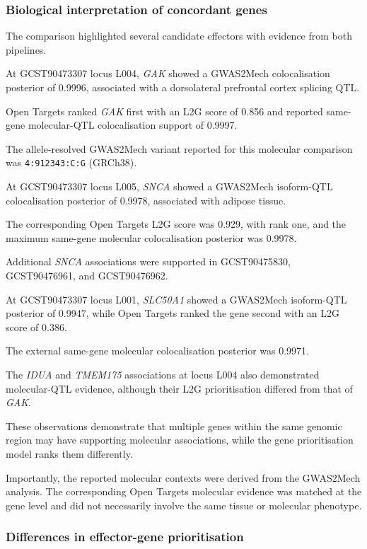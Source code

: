 \documentclass[11pt,a4paper]{article}
\begin{document}
\subsubsection{Biological interpretation of concordant genes}

The comparison highlighted several candidate
effectors with evidence from both pipelines.

At GCST90473307 locus L004, \textit{GAK}
showed a GWAS2Mech colocalisation posterior
of 0.9996, associated with a dorsolateral
prefrontal cortex splicing QTL.

Open Targets ranked \textit{GAK} first
with an L2G score of 0.856 and
reported same-gene molecular-QTL
colocalisation support of 0.9997.

The allele-resolved GWAS2Mech variant
reported for this molecular comparison
was \texttt{4:912343:C:G} (GRCh38).

At GCST90473307 locus L005,
\textit{SNCA} showed a GWAS2Mech
isoform-QTL colocalisation posterior
of 0.9978, associated with adipose tissue.

The corresponding Open Targets L2G
score was 0.929, with rank one, and
the maximum same-gene molecular
colocalisation posterior was 0.9978.

Additional \textit{SNCA} associations
were supported in GCST90475830,
GCST90476961, and GCST90476962.

At GCST90473307 locus L001,
\textit{SLC50A1} showed a GWAS2Mech
isoform-QTL posterior of 0.9947,
while Open Targets ranked the gene
second with an L2G score of 0.386.

The external same-gene molecular
colocalisation posterior was 0.9971.

The \textit{IDUA} and \textit{TMEM175}
associations at locus L004 also
demonstrated molecular-QTL evidence,
although their L2G prioritisation
differed from that of \textit{GAK}.

These observations demonstrate that
multiple genes within the same genomic
region may have supporting molecular
associations, while the gene
prioritisation model ranks them
differently.

Importantly, the reported molecular
contexts were derived from the
GWAS2Mech analysis. The corresponding
Open Targets molecular evidence was
matched at the gene level and did
not necessarily involve the same tissue
or molecular phenotype.


\subsubsection{Differences in effector-gene prioritisation}
\end{document}
